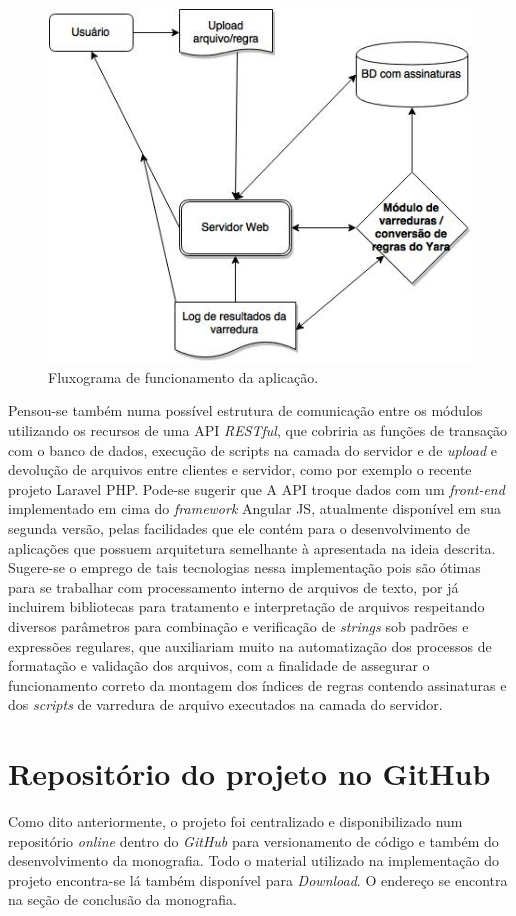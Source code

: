 \begin{figure}[H]
  \includegraphics[scale=0.6]{figs/flux_prototipo}
  \centering
  \caption{Fluxograma de funcionamento da aplicação.}
  \label{f.flux_prototipo}
\end{figure}

Pensou-se também numa possível estrutura de comunicação entre os módulos
utilizando os recursos de uma API \textit{RESTful}, que cobriria as funções de
transação com o banco de dados, execução de scripts na camada do servidor e de
\textit{upload} e devolução de arquivos entre clientes e servidor, como por
exemplo o recente projeto Laravel PHP. Pode-se sugerir que A API troque dados
com um \textit{front-end} implementado em cima do \textit{framework} Angular JS,
atualmente disponível em sua segunda versão, pelas facilidades que ele contém
para o desenvolvimento de aplicações que possuem arquitetura semelhante à
apresentada na ideia descrita. Sugere-se o emprego de tais tecnologias nessa
implementação pois são ótimas para se trabalhar com processamento interno de
arquivos de texto, por já incluirem bibliotecas para tratamento e interpretação
de arquivos respeitando diversos parâmetros para combinação e verificação de
\textit{strings} sob padrões e expressões regulares, que auxiliariam muito na
automatização dos processos de formatação e validação dos arquivos, com a
finalidade de assegurar o funcionamento correto da montagem dos índices de
regras contendo assinaturas e dos \textit{scripts} de varredura de arquivo
executados na camada do servidor.

\section{Repositório do projeto no GitHub}
\label{s.repositorio}
Como dito anteriormente, o projeto foi centralizado e disponibilizado num
repositório \textit{online} dentro do \textit{GitHub} para versionamento de
código e também do desenvolvimento da monografia. Todo o material utilizado na
implementação do projeto encontra-se lá também disponível para
\textit{Download}. O endereço se encontra na seção de conclusão da monografia.
